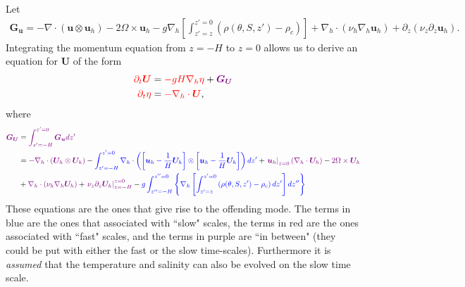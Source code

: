 \documentclass{article}
\newcommand{\cblue}[1]{{\color{blue}#1}}
\newcommand{\cred}[1]{{\color{red}#1}}
\newcommand{\cpurple}[1]{{\color{purple}#1}}
\begin{document}
Let 
\begin{align}
    \bm{G}_{\bm{u}} = -  \nabla \cdot \left( \bm{u} \otimes \bm{u}_h  \right) - 2 \Omega \times \bm{u}_h - g \nabla_h \left[ \int^{z' = 0}_{z' = z} \left( \rho(\theta, S, z') - \rho_c \right) \right] + \nabla_h \cdot \left( \nu_h  \nabla_h \bm{u}_h \right) + \partial_z \left( \nu_z \partial_z \bm{u}_h \right) .
\end{align}
Integrating the momentum equation from $z = -H$ to $z= 0$ allows us to derive an equation for $\bm{U}$ of the form 
\begin{align}
    \cred{ \partial_t \bm{U} } 
    &= \cred{-gH \nabla_h \eta} + \cpurple{\bm{G}_{\bm{U}}} \\
    \cred{ \partial_t \eta } &=\cred{ - \nabla_h \cdot \bm{U}},
\end{align}
where
\begin{align} 
 \cpurple{\bm{G}_{\bm{U}}} &= \cpurple{ \int_{z'=-H}^{z' = 0} \bm{G}_{\bm{u}} dz' } \\
     &= 
     \cpurple{-\nabla_h \cdot \left( \bm{U}_h \otimes \bm{U}_h  \right) }
     - \cblue{ \int_{z'=-H}^{z' = 0} \nabla_h \cdot \left( \left[ \bm{u}_h- \frac{1}{H}\bm{U}_h \right]  \otimes \left[ \bm{u}_h- \frac{1}{H}\bm{U}_h \right]  \right) dz'}  + \cpurple{ \left. \bm{u}_h \right|_{z = 0}\left(\nabla_h \cdot \bm{U}_h\right) } - \cpurple{ 2 \Omega \times \bm{U}_h } \\
    & + \cpurple{ \nabla_h \cdot \left( \nu_h  \nabla_h \bm{U}_h \right) } + \cpurple{ \left. \nu_z \partial_z \bm{U}_h \right|_{z=-H}^{z=0} }
    -  \cblue{ g \int_{z''=-H}^{z'' = 0} \left\{ \nabla_h \left[ \int^{z' = 0}_{z' = z} \left( \rho(\theta, S, z') - \rho_c \right) dz' \right] dz'' \right\} }  \nonumber
\end{align}
These equations are the ones that give rise to the offending mode. The terms in \cblue{blue} are the ones that associated with ``slow" scales, the terms in \cred{red} are the ones associated with ``fast" scales, and the terms in \cpurple{purple} are ``in between" (they could be put with either the fast or the slow time-scales). Furthermore it is \textit{assumed} that the temperature and salinity can also be evolved on the slow time scale.
\end{document}
